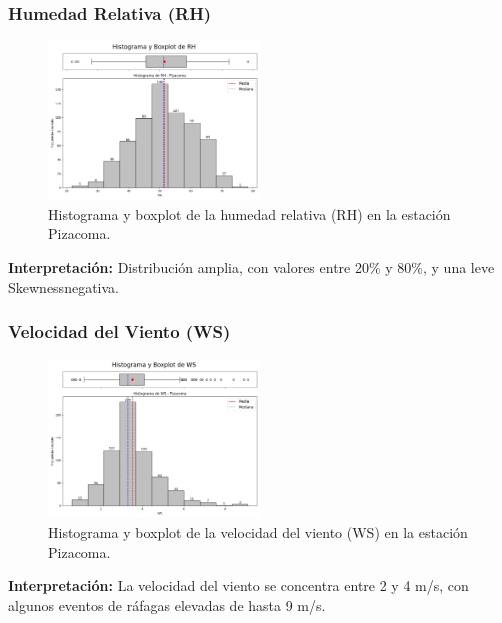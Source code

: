 \subsubsection*{Humedad Relativa (RH)}
\begin{figure}[H]
\centering
\includegraphics[width=0.5\textwidth]{resultados/por_estacion_meteorologica/Pizacoma/RH_histograma.png}
\caption{Histograma y boxplot de la humedad relativa (RH) en la estación Pizacoma.}
\label{fig:pizacoma_RH}
\end{figure}
\textbf{Interpretación:} Distribución amplia, con valores entre 20\% y 80\%, y una leve Skewnessnegativa.

\subsubsection*{Velocidad del Viento (WS)}
\begin{figure}[H]
\centering
\includegraphics[width=0.5\textwidth]{resultados/por_estacion_meteorologica/Pizacoma/WS_histograma.png}
\caption{Histograma y boxplot de la velocidad del viento (WS) en la estación Pizacoma.}
\label{fig:pizacoma_WS}
\end{figure}
\textbf{Interpretación:} La velocidad del viento se concentra entre 2 y 4 m/s, con algunos eventos de ráfagas elevadas de hasta 9 m/s.

